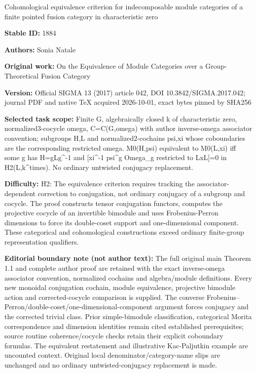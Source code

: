 \documentclass[11pt]{article}
\numberwithin{equation}{section}
\newcommand{\1}{\textbf{1}}
\begin{document}
\begin{center}\Large Cohomological equivalence criterion for indecomposable module categories of a finite pointed fusion category in characteristic zero\end{center}
\noindent\textbf{Stable ID:} 1884\par
\noindent\textbf{Authors:} Sonia Natale\par
\noindent\textbf{Original work:} On the Equivalence of Module Categories over a Group-Theoretical Fusion Category\par
\noindent\textbf{Version:} Official SIGMA 13 (2017) article 042, DOI 10.3842/SIGMA.2017.042; journal PDF and native TeX acquired 2026-10-01, exact bytes pinned by SHA256\par
\noindent\textbf{Selected task scope:} Finite G, algebraically closed k of characteristic zero, normalized3-cocycle omega, C=\allowbreak{}C(G,omega) with author inverse-omega associator convention; subgroups H,L and normalized2-cochains psi,xi whose coboundaries are the corresponding restricted omega. M0(H,psi) equivalent to M0(L,xi) iff some g has H=\allowbreak{}gLg\textasciicircum{}-1 and [xi\textasciicircum{}-1 psi\textasciicircum{}g Omega\_g restricted to LxL]=\allowbreak{}0 in H2(L,k\textasciicircum{}times). No ordinary untwisted conjugacy replacement.\par
\noindent\textbf{Difficulty:} H2: The equivalence criterion requires tracking the associator-dependent correction to conjugation, not ordinary conjugacy of a subgroup and cocycle. The proof constructs tensor conjugation functors, computes the projective cocycle of an invertible bimodule and uses Frobenius-Perron dimensions to force its double-coset support and one-dimensional component. These categorical and cohomological constructions exceed ordinary finite-group representation qualifiers.\par
\noindent\textbf{Editorial boundary note (not author text):} The full original main Theorem 1.1 and complete author proof are retained with the exact inverse-omega associator convention, normalized cochains and algebra/module definitions. Every new monoidal conjugation cochain, module equivalence, projective bimodule action and corrected-cocycle comparison is supplied. The converse Frobenius–Perron/double-coset/one-dimensional-component argument forces conjugacy and the corrected trivial class. Prior simple-bimodule classification, categorical Morita correspondence and dimension identities remain cited established prerequisites; source routine coherence/cocycle checks retain their explicit coboundary formulas. The equivalent restatement and illustrative Kac-Paljutkin example are uncounted context. Original local denominator/category-name slips are unchanged and no ordinary untwisted-conjugacy replacement is made.\par
\end{document}
